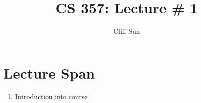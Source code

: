 \documentclass{article}
\title{CS 357: Lecture \# 1}
\author{Cliff Sun}
\newtheorem{one minute paper}[theorem]{One Minute Paper}
\begin{document}
\maketitle

\section*{Lecture Span}
\begin{enumerate}
    \item Introduction into course
\end{enumerate}
\end{document}
